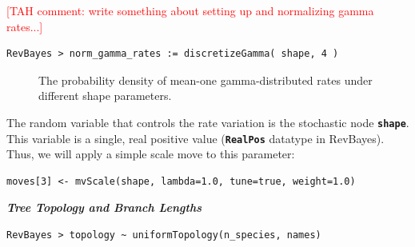 \documentclass[11pt]{article}
\newcommand{\taha}[1]{{\textcolor{red}{[TAH comment: #1]}}} %
\newcommand{\cl}[1]{{\texttt{\textbf{#1}}}}
\begin{document}
\taha{write something about setting up and normalizing gamma rates...}
{\tt \begin{snugshade*}
\begin{lstlisting}
RevBayes > norm_gamma_rates := discretizeGamma( shape, 4 )
\end{lstlisting}
\end{snugshade*}}



\begin{figure}[h]
\centering
{}
\caption{\small The probability density of mean-one gamma-distributed rates under different shape parameters.}
\label{asrhGammaFig}
\end{figure}

The random variable that controls the rate variation is the stochastic node \cl{shape}. This variable is a single, real positive value (\cl{RealPos} datatype in RevBayes). 
Thus, we will apply a simple scale move to this parameter:

{\tt \begin{snugshade*}
\begin{lstlisting}
moves[3] <- mvScale(shape, lambda=1.0, tune=true, weight=1.0)\end{lstlisting}
\end{snugshade*}}


\textbf{\textit{Tree Topology and Branch Lengths}}

{\tt \begin{snugshade*}
\begin{lstlisting}
RevBayes > topology ~ uniformTopology(n_species, names)
\end{lstlisting}
\end{snugshade*}}
\end{document}
